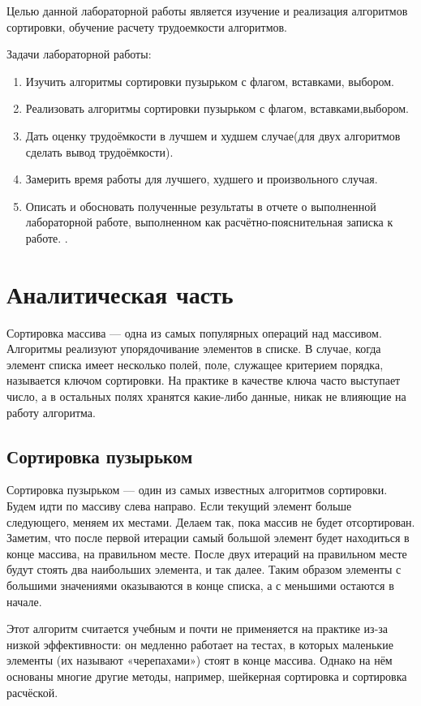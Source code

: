 \documentclass[12pt]{report}
\begin{document}
Целью данной лабораторной работы является изучение и реализация алгоритмов сортировки, обучение расчету трудоемкости алгоритмов.
\newline

Задачи лабораторной работы:
\begin{enumerate}
  	\item Изучить алгоритмы сортировки пузырьком с флагом, вставками, выбором.
  	\item Реализовать алгоритмы сортировки пузырьком с флагом, вставками,выбором.
  	\item Дать оценку трудоёмкости в лучшем и худшем случае(для двух алгоритмов сделать вывод трудоёмкости).
  	\item Замерить время работы для лучшего, худшего и произвольного случая.
  	\item Описать и обосновать полученные результаты в отчете о выполненной лабораторной
  	работе, выполненном как расчётно-пояснительная записка к работе. .
\end{enumerate}

\chapter{Аналитическая часть}

Сортировка массива — одна из самых популярных операций над массивом. Алгоритмы реализуют упорядочивание элементов в списке. В случае, когда элемент списка имеет несколько полей, поле, служащее критерием порядка, называется ключом сортировки. На практике в качестве ключа часто выступает число, а в остальных полях хранятся какие-либо данные, никак не влияющие на работу алгоритма. 

\section{Сортировка пузырьком}

Сортировка пузырьком — один из самых известных алгоритмов сортировки. Будем идти по массиву слева направо. Если текущий элемент больше следующего, меняем их местами. Делаем так, пока массив не будет отсортирован. Заметим, что после первой итерации самый большой элемент будет находиться в конце массива, на правильном месте. После двух итераций на правильном месте будут стоять два наибольших элемента, и так далее. Таким образом элементы с большими значениями оказываются в конце списка, а с меньшими остаются в начале.

Этот алгоритм считается учебным и почти не применяется на практике из-за низкой эффективности: он медленно работает на тестах, в которых маленькие элементы (их называют «черепахами») стоят в конце массива. Однако на нём основаны многие другие методы, например, шейкерная сортировка и сортировка расчёской.
\end{document}
